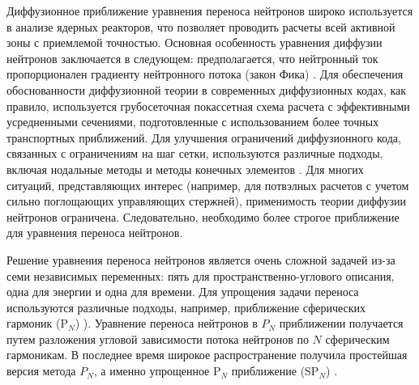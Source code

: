 \documentclass{crm-article}
\begin{document}
Диффузионное приближение уравнения переноса нейтронов широко используется в анализе ядерных реакторов, что позволяет проводить расчеты всей активной зоны с приемлемой точностью.
Основная особенность уравнения диффузии нейтронов заключается в следующем: предполагается, что нейтронный ток пропорционален градиенту нейтронного потока (закон Фика) \cite{stacey2007}.
Для обеспечения обоснованности диффузионной теории в современных диффузионных кодах, как правило, используется грубосеточная покассетная схема расчета с эффективными усредненными сечениями, подготовленные с использованием более точных транспортных приближений.
Для улучшения ограничений диффузионного кода, связанных с ограничениям на шаг сетки, используются различные подходы, включая нодальные методы и методы конечных элементов \cite{lawrence1986}.
Для многих ситуаций, представляющих интерес (например, для потвэлных расчетов с учетом сильно поглощающих управляющих стержней), применимость теории диффузии нейтронов ограничена.
Следовательно, необходимо более строгое приближение для уравнения переноса нейтронов.

Решение уравнения переноса нейтронов \cite{lewis1984} является очень сложной задачей из-за семи независимых переменных: пять для пространственно-углового описания, одна для энергии и одна для времени.
Для упрощения задачи переноса используются различные подходы, например, приближение сферических гармоник (P$_N$) \cite{azmy2010}).
Уравнение переноса нейтронов в $P_N$ приближении получается путем разложения угловой зависимости потока нейтронов по $N$ сферическим гармоникам.
В последнее время широкое распространение получила простейшая версия метода $P_N$, а именно упрощенное P$_N$ приближение (SP$_N$) \cite{mcclarren2010}.
\end{document}
